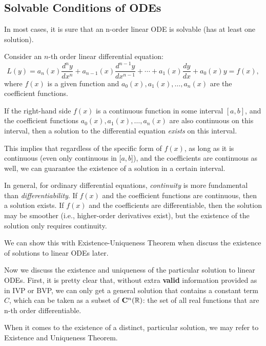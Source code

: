 \subsection{Solvable Conditions of ODEs}

In most cases, it is sure that an n-order linear ODE is solvable (has at least one solution).

\begin{theorem}
Consider an \(n\)-th order linear differential equation:
\[
L(y) = a_n(x) \frac{d^n y}{dx^n} + a_{n-1}(x) \frac{d^{n-1} y}{dx^{n-1}} + \cdots + a_1(x) \frac{dy}{dx} + a_0(x) y = f(x),
\]
where \(f(x)\) is a given function and \(a_0(x), a_1(x), \dots, a_n(x)\) are the coefficient functions.

If the right-hand side \(f(x)\) is a continuous function in some interval \([a,b]\), and the coefficient functions \(a_0(x), a_1(x), \dots, a_n(x)\) are also continuous on this interval, then a solution to the differential equation \textit{exists} on this interval.

This implies that regardless of the specific form of \(f(x)\), as long as it is continuous (even only continuous in [$a,b$]), and the coefficients are continuous as well, we can guarantee the existence of a solution in a certain interval.
\end{theorem}
In general, for ordinary differential equations, \textit{continuity} is more fundamental than \textit{differentiability}. If \(f(x)\) and the coefficient functions are continuous, then a solution exists. If \(f(x)\) and the coefficients are differentiable, then the solution may be smoother (i.e., higher-order derivatives exist), but the existence of the solution only requires continuity.

We can show this with Existence-Uniqueness Theorem when discuss the existence of solutions to linear ODEs later.

Now we discuss the existence and uniqueness of the particular solution to linear ODEs. First, it is pretty clear that, without extra \textbf{valid} information provided as in IVP or BVP, we can only get a general solution that contains a constant term $C$, which can be taken as a subset of $\mathbf{C}^n(\mathbb{R})$: the set of all real functions that are n-th order differentiable.

When it comes to the existence of a distinct, particular solution, we may refer to Existence and Uniqueness Theorem.

